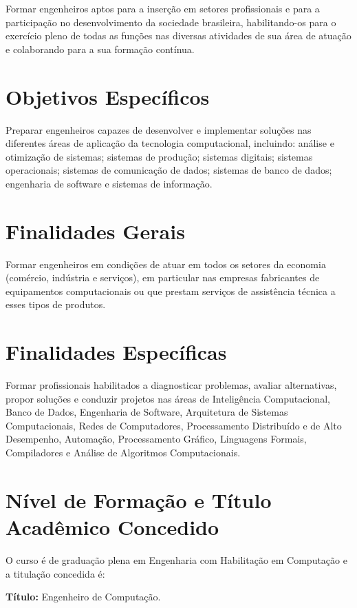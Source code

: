 Formar engenheiros aptos para a inserção em setores profissionais e para a participação no desenvolvimento da sociedade brasileira, habilitando-os para o exercício pleno de todas as funções nas diversas atividades de sua área de atuação e colaborando para a sua formação contínua.

\section{Objetivos Específicos}
Preparar engenheiros capazes de desenvolver e implementar soluções nas diferentes áreas de aplicação da tecnologia computacional, incluindo: análise e otimização de sistemas; sistemas de produção; sistemas digitais; sistemas operacionais; sistemas de comunicação de dados; sistemas de banco de dados; engenharia de software e sistemas de informação.

\section{Finalidades Gerais}
Formar engenheiros em condições de atuar em todos os setores da economia (comércio, indústria e serviços), em particular nas empresas fabricantes de equipamentos computacionais ou que prestam serviços de assistência técnica a esses tipos de produtos.

\section{Finalidades Específicas}
Formar profissionais habilitados a diagnosticar problemas, avaliar alternativas, propor soluções e conduzir projetos nas áreas de Inteligência Computacional, Banco de Dados, Engenharia de Software, Arquitetura de Sistemas Computacionais, Redes de Computadores, Processamento Distribuído e de Alto Desempenho, Automação, Processamento Gráfico, Linguagens Formais, Compiladores e Análise de Algoritmos Computacionais.

\section{Nível de Formação e Título Acadêmico Concedido}
O curso é de graduação plena em Engenharia com Habilitação em Computação e a titulação concedida é:

\textbf{Título:} Engenheiro de Computação.

